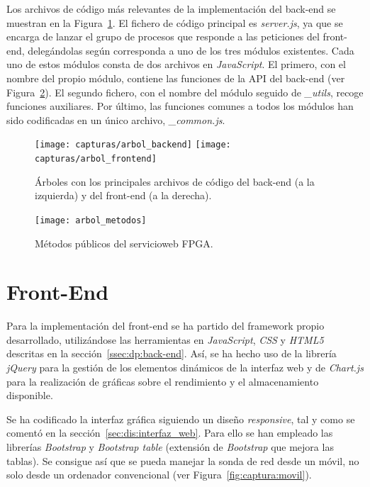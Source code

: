 Los archivos de código más relevantes de la implementación del \gls{back-end} se muestran en la Figura~\ref{fig:arbol_codigo}.
El fichero de código principal es \textit{server.js}, ya que se encarga de lanzar el grupo de procesos que responde a las peticiones del \gls{front-end}, delegándolas según corresponda a uno de los tres módulos existentes.
Cada uno de estos módulos consta de dos archivos en \textit{JavaScript}.
El primero, con el nombre del propio módulo, contiene las funciones de la \gls{API} del \gls{back-end} (ver Figura~\ref{fig:arbol_metodos}).
El segundo fichero, con el nombre del módulo seguido de \textit{\_utils}, recoge funciones auxiliares.
Por último, las funciones comunes a todos los módulos han sido codificadas en un único archivo, \textit{\_common.js}.

\begin{figure}[!htp]
  \begin{center}
    \texttt{[image: capturas/arbol\_backend]}
    \hspace{1cm}
    \texttt{[image: capturas/arbol\_frontend]}
  \caption{Árboles con los principales archivos de código del \gls{back-end} (a la izquierda) y del \gls{front-end} (a la derecha).}
  \label{fig:arbol_codigo}
  \end{center}
\end{figure}

\begin{figure}[!htp]
  \centering
  \texttt{[image: arbol\_metodos]}
  \caption{Métodos públicos del \gls{servicioweb} \gls{FPGA}.}
  \label{fig:arbol_metodos}
\end{figure}

\section{Front-End\label{sec:imp:front_end}}

Para la implementación del \gls{front-end} se ha partido del \gls{framework} propio desarrollado, utilizándose las herramientas en \textit{JavaScript}, \textit{CSS} y \textit{HTML5} descritas en la sección~\ref{ssec:dp:back-end}.
Así, se ha hecho uso de la librería \textit{jQuery} para la gestión de los elementos dinámicos de la interfaz web y de \textit{Chart.js} para la realización de gráficas sobre el rendimiento y el almacenamiento disponible.

Se ha codificado la interfaz gráfica siguiendo un diseño \textit{responsive}, tal y como se comentó en la sección~\ref{sec:dis:interfaz_web}.
Para ello se han empleado las librerías \textit{Bootstrap} y \textit{Bootstrap table} (extensión de \textit{Bootstrap} que mejora las tablas).
Se consigue así que se pueda manejar la sonda de red desde un móvil, no solo desde un ordenador convencional (ver Figura~\ref{fig:captura:movil}).

